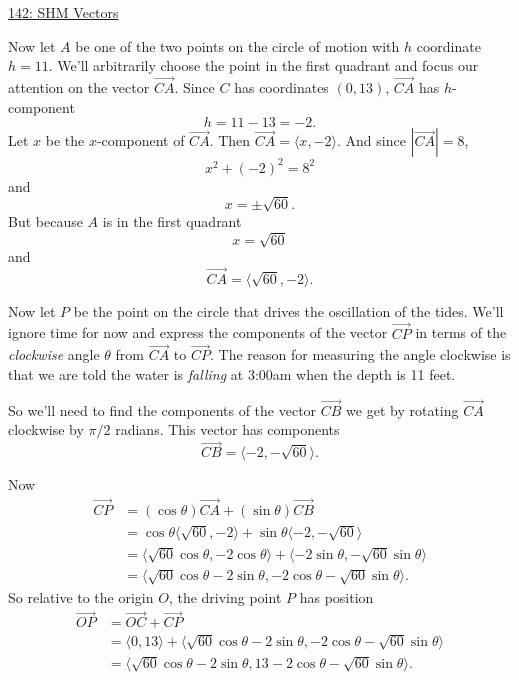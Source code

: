 \documentclass{ximera}
\begin{document}
\begin{question}
\begin{explanation}
\href{https://www.desmos.com/calculator/mo7ekjkp2s}{142: SHM Vectors}



Now let $A$ be one of the two points on the circle of motion with $h$ coordinate $h=11$. We'll arbitrarily choose the point in the first quadrant and focus our attention on the vector $\overrightarrow{CA}$. Since $C$ has coordinates $(0,13)$, $\overrightarrow{CA}$ has $h$-component
\[
    h = 11 - 13 = -2 .
\]
Let $x$ be the $x$-component of $\overrightarrow{CA}$. Then $\overrightarrow{CA} = \langle x, -2 \rangle$. And since $|\overrightarrow{CA}| = 8$,
\[
x^2 + (-2)^2 = 8^2
\]
and 
\[
  x = \pm \sqrt{60}.
\]
But because $A$ is in the first quadrant 
\[
    x = \sqrt{60}
\]
and
\[
\overrightarrow{CA} = \langle \sqrt{60},-2\rangle.
\]



Now let $P$ be the point on the circle that drives the oscillation of the tides. We'll ignore time for now and express the components of the vector $\overrightarrow{CP}$ in terms of the \emph{clockwise} angle $\theta$ from $\overrightarrow{CA}$ to $\overrightarrow{CP}$. The reason for measuring the angle clockwise is that we are told the water is \emph{falling} at 3:00am when the depth is 11 feet.

So we'll need to find the components of the vector $\overrightarrow{CB}$ we get by rotating $\overrightarrow{CA}$ clockwise by $\pi/2$ radians. This vector has components
\[
  \overrightarrow{CB}  = \langle -2, -\sqrt{60}\rangle .
\]

Now
\begin{align*}
      \overrightarrow{CP} & = (\cos \theta)\overrightarrow{CA} + (\sin\theta) \overrightarrow{CB} \\
                                    & = \cos\theta \langle \sqrt{60},-2 \rangle  + \sin \theta \langle -2, -\sqrt{60} \rangle \\
                                    & =  \langle \sqrt{60}\cos\theta,-2\cos\theta \rangle  +  \langle -2\sin \theta, -\sqrt{60}\sin \theta \rangle\\
                                    & = \langle \sqrt{60}\cos\theta - 2 \sin \theta,  -2\cos\theta -\sqrt{60}\sin \theta \rangle .
\end{align*}
So relative to the origin $O$, the driving point $P$ has position
\begin{align*}
  \overrightarrow{OP} & = \overrightarrow{OC} + \overrightarrow{CP}  \\
                                & = \langle 0, 13 \rangle +  \langle \sqrt{60}\cos\theta - 2 \sin \theta,  -2\cos\theta -\sqrt{60}\sin \theta \rangle \\
                               & =  \langle \sqrt{60}\cos\theta - 2 \sin \theta,  13-2\cos\theta -\sqrt{60}\sin \theta \rangle .
\end{align*}


\end{explanation}
\end{question}
\end{document}
